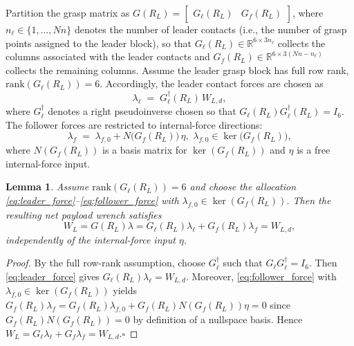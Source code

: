 \documentclass[letterpaper, 10 pt, conference]{ieeeconf}  %
\newcommand{\0}{\matr{0}}
\newtheorem{lemma}{Lemma}
\begin{document}
Partition the grasp matrix as
$G(R_L)=\begin{bmatrix}G_\ell(R_L) & G_f(R_L)\end{bmatrix}$, where
$n_\ell\in\{1,\ldots,Nn\}$ denotes the number of leader contacts (i.e., the number of grasp points assigned to the leader block),
so that $G_\ell(R_L)\in\mathbb R^{6\times 3n_\ell}$ collects the columns associated with the leader contacts and
$G_f(R_L)\in\mathbb R^{6\times 3(Nn-n_\ell)}$ collects the remaining columns.
Assume the leader grasp block has full row rank, $\mathrm{rank}(G_\ell(R_L))=6$.
Accordingly, the leader contact forces are chosen as
\begin{equation}
\lambda_\ell \;=\; G_\ell^\dagger(R_L)\,W_{L,d},
\label{eq:leader_force}
\end{equation}
where $G_\ell^\dagger$ denotes a right pseudoinverse chosen so that
$G_\ell(R_L)G_\ell^\dagger(R_L)=I_6$.
The follower forces are restricted to internal-force directions:
\begin{equation}
\lambda_f \;=\; \lambda_{f,0} + N\!\big(G_f(R_L)\big)\,\eta,
\,\,
\lambda_{f,0}\in\ker\!\big(G_f(R_L)\big),
\label{eq:follower_force}
\end{equation}
where $N(G_f(R_L))$ is a basis matrix for $\ker(G_f(R_L))$ and $\eta$ is a free internal-force input.

\begin{lemma}
\label{lem:wrench_consistency}
Assume $\mathrm{rank}(G_\ell(R_L))=6$ and choose the allocation \eqref{eq:leader_force}--\eqref{eq:follower_force}
with $\lambda_{f,0}\in\ker(G_f(R_L))$. Then the resulting net payload wrench satisfies
\begin{equation}
W_L=G(R_L)\lambda=G_\ell(R_L)\lambda_\ell + G_f(R_L)\lambda_f=W_{L,d},
\label{eq:wrench_consistency}
\end{equation}
independently of the internal-force input $\eta$.
\end{lemma}

\begin{proof}
By the full row-rank assumption, choose $G_\ell^\dagger$ such that $G_\ell G_\ell^\dagger=I_6$.
Then \eqref{eq:leader_force} gives $G_\ell(R_L)\lambda_\ell = W_{L,d}$.
Moreover, \eqref{eq:follower_force} with $\lambda_{f,0}\in\ker(G_f(R_L))$ yields
$G_f(R_L)\lambda_f = G_f(R_L)\lambda_{f,0}+G_f(R_L)N(G_f(R_L))\eta = 0$ since
$G_f(R_L)N(G_f(R_L))=0$ by definition of a nullspace basis.
Hence $W_L = G_\ell\lambda_\ell + G_f\lambda_f = W_{L,d}$.\hfill$\square$
\end{proof}
\end{document}

